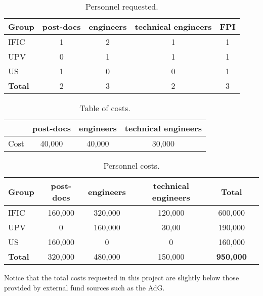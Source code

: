 \begin{table}[h!]
\begin{center}
\begin{tabular}{|l|c|c|c|c|}
\hline
Group &	post-docs	& engineers &	technical engineers & FPI\\
 \hline
IFIC &	1 &	2	&1 &	1\\			
UPV	  & 0	&1 &	1 &	1 \\			
US	& 1 &	0 &	0 &	 1\\			
 \hline
{\bf Total} & 2 & 3 & 2 & 3 \\
 \hline\hline
\end{tabular}  
\caption{Personnel requested.}
\label{tab.P}
\end{center}
\end{table} 

\begin{table}[h!]
\begin{center}
\begin{tabular}{|l|c|c|c|}
\hline
 &	post-docs	& engineers &	technical engineers \\
 \hline
Cost &	40,000 &	40,000	&30,000 \\					
 \hline\hline
\end{tabular}  
\caption{Table of costs.}
\label{tab.new:PT}
\end{center}
\end{table} 

\begin{table}[h!]
\begin{center}
\begin{tabular}{|l|c|c|c|c|c|}
\hline
Group &	post-docs	& engineers &	technical engineers &  Total \\
 \hline
IFIC	&160,000 &	320,000 &	120,000 & 600,000 \\
UPV	 &	0 & 160,000 &	30,00 &	190,000 \\
US	& 160,000 & 0 & 0 &	160,000\\
\hline
{\bf Total} & 320,000 & 480,000 & 150,000 & {\bf 950,000} \\
 \hline\hline
\end{tabular}  
\caption{Personnel costs.}
\label{tab.new:PC}
\end{center}
\end{table} 

Notice that the total costs requested in this project are slightly below those provided by external fund sources such as the AdG. 

